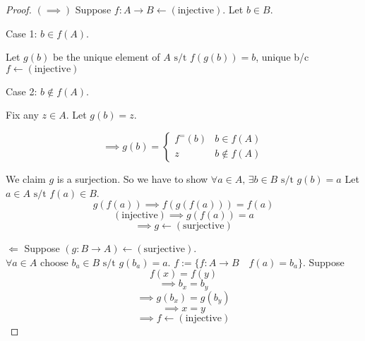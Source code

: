 \documentclass[12pt]{report}
\theoremstyle{theoremdd}
\newcommand{\T}[1]{\text{#1}}
\newcommand{\TM}[1]{(\T{#1})}
\newcommand{\st}{\T{ s/t }}
\newcommand{\ot}{\leftarrow}
\newcommand{\limplies}{\Longleftarrow}
\newcommand{\is}{\ot}
\begin{document}
\begin{proof}
  \((\implies)\) Suppose \(f:A\to B\is(\T{injective})\). Let \(b\in B\).
  
  Case 1: \(b\in f(A)\). 

  Let \(g(b)\) be the unique element of \(A\st f(g(b))=b\), unique b/c 
  \(f\is\TM{injective}\)

  Case 2: \(b\not\in f(A)\).

  Fix any \(z\in A\). Let \(g(b)=z\).
  
  \begin{equation}
    \implies g(b)=\begin{cases}f^{=}(b)&b\in f(A)\\ z&b\not\in f(A)\end{cases}
  \end{equation}

  We claim \(g\) is a surjection. 
  So we have to show
  \(\forall a\in A,\,\exists b\in B\st g(b)=a\)
  Let \(a\in A\st f(a)\in B\).
  \[g(f(a))\implies f(g(f(a)))=f(a)\]
  \[\TM{injective}\implies g(f(a))=a\]
  \[\implies g\is\TM{surjective}\]

  \(\limplies\) Suppose \((g:B\to A)\is\TM{surjective}\).
  \(\forall a\in A\T{ choose }b_a\in B\st g(b_a)=a\).
  \(f:=\{f:A\to B\quad f(a)=b_a\}\). Suppose
  \[f(x)=f(y)\]
  \[\implies b_x=b_y\]
  \[\implies g(b_x)=g(b_y)\]
  \[\implies x=y\]
  \[\implies f\is\TM{injective}\]
\end{proof}

\end{document}
